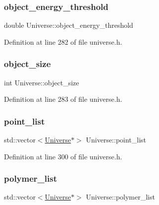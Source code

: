 \subsubsection{\texorpdfstring{object\+\_\+energy\+\_\+threshold}{object\_energy\_threshold}}
{\footnotesize\ttfamily double Universe\+::object\+\_\+energy\+\_\+threshold}



Definition at line 282 of file universe.\+h.

\mbox{\label{class_universe_a64f4f4025c9be1d84492c766a002a6d4}} 
\subsubsection{\texorpdfstring{object\+\_\+size}{object\_size}}
{\footnotesize\ttfamily int Universe\+::object\+\_\+size}



Definition at line 283 of file universe.\+h.

\mbox{\label{class_universe_a9dc8abd2f8f84318722184f38e1b8cc7}} 
\subsubsection{\texorpdfstring{point\+\_\+list}{point\_list}}
{\footnotesize\ttfamily std\+::vector$<$\mbox{\hyperlink{class_universe}{Universe}}$\ast$$>$ Universe\+::point\+\_\+list\hspace{0.3cm}{\ttfamily [protected]}}



Definition at line 300 of file universe.\+h.

\mbox{\label{class_universe_a4d898757f2d67ca5ab5d504388d6199a}} 
\subsubsection{\texorpdfstring{polymer\+\_\+list}{polymer\_list}}
{\footnotesize\ttfamily std\+::vector$<$\mbox{\hyperlink{class_universe}{Universe}}$\ast$$>$ Universe\+::polymer\+\_\+list\hspace{0.3cm}{\ttfamily [protected]}}



